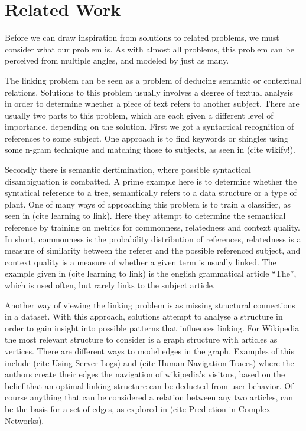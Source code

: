 \section{Related Work}\label{sec:related_work}

Before we can draw inspiration from solutions to related problems, we must consider what our problem is. As with almost all problems, this problem can be perceived from multiple angles, and modeled by just as many.

The linking problem can be seen as a problem of deducing semantic or contextual relations. Solutions to this problem usually involves a degree of textual analysis in order to determine whether a piece of text refers to another subject. There are usually two parts to this problem, which are each given a different level of importance, depending on the solution. First we got a syntactical recognition of references to some subject. One approach is to find keywords or shingles using some n-gram technique and matching those to subjects, as seen in (cite wikify!). 

Secondly there is semantic dertimination, where possible syntactical disambiguation is combatted. A prime example here is to determine whether the syntatical reference to a tree, semantically refers to a data structure or a type of plant. One of many ways of approaching this problem is to train a classifier, as seen in (cite learning to link). Here they attempt to determine the semantical reference by training on metrics for commonness, relatedness and context quality. In short, commonness is the probability distribution of references, relatedness is a measure of similarity between the referer and the possible referenced subject, and context quality is a measure of whether a given term is usually linked. The example given in (cite learning to link) is the english grammatical article \enquote{The}, which is used often, but rarely links to the subject article.

Another way of viewing the linking problem is as missing structural connections in a dataset. With this approach, solutions attempt to analyse a structure in order to gain insight into possible patterns that influences linking. For Wikipedia the most relevant structure to consider is a graph structure with articles as vertices. There are different ways to model edges in the graph. Examples of this include (cite Using Server Logs) and (cite Human Navigation Traces) where the authors create their edges the navigation of wikipedia's visitors, based on the belief that an optimal linking structure can be deducted from user behavior. Of course anything that can be considered a relation between any two articles, can be the basis for a set of edges, as explored in (cite Prediction in Complex Networks).

